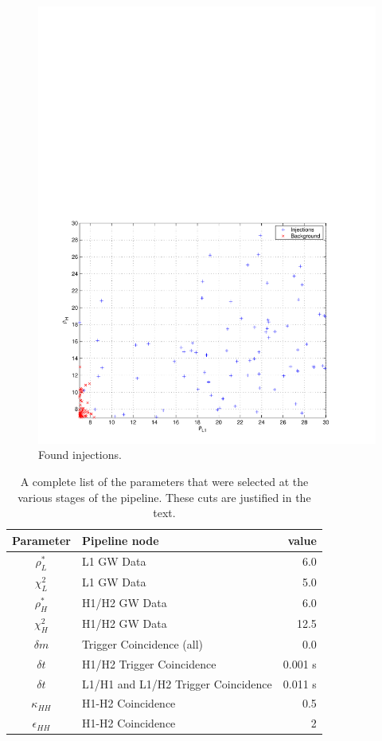 \begin{figure}[p]
\begin{center}
\includegraphics[width=\textwidth]{figures/result/bkg_inj_zoom}
\end{center}
\caption{\label{f:bkg_hist}%
Found injections.
}
\end{figure}

\begin{table}
\caption{\label{t:ifo_params}%
A complete list of the parameters that were selected at the various
stages of the pipeline.   These cuts are justified in the text.
}
\begin{tabular}{clr}
Parameter & Pipeline node & value \\
\hline 
$\rho^\ast_L$ & L1 GW Data & 6.0 \\
$\chi^2_L$ & L1 GW Data & 5.0 \\
$\rho^\ast_H$ & H1/H2 GW Data & 6.0 \\
$\chi^2_H$ & H1/H2 GW Data & 12.5 \\
$\delta m$ & Trigger Coincidence (all) & 0.0 \\
$\delta t$ & H1/H2 Trigger Coincidence & 0.001 s \\
$\delta t$ & L1/H1 and L1/H2 Trigger Coincidence & 0.011 s \\
$\kappa_{HH}$ & H1-H2 Coincidence & 0.5 \\
$\epsilon_{HH}$ & H1-H2 Coincidence & 2
\end{tabular}
\end{table}





